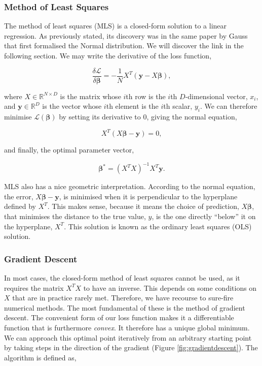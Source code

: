 \documentclass[11pt]{amsart}
\begin{document}
\subsubsection{Method of Least Squares}

The method of least squares (MLS) is a closed-form solution to a linear regression. As previously stated, its discovery was in the same paper by Gauss that first formalised the Normal distribution. We will discover the link in the following section. We may write the derivative of the loss function,

$$\frac{\delta\mathcal{L}}{\delta\boldsymbol\beta} = -\frac{1}{N}X^T(\mathbf{y} - X\boldsymbol\beta),$$

where $X \in \mathbb{R}^{N\times D}$ is the matrix whose $i$th row is the $i$th $D$-dimensional vector, $x_i$, and $\mathbf{y} \in \mathbb{R}^D$ is the vector whose $i$th element is the $i$th scalar, $y_i$. We can therefore minimise $\mathcal{L}(\boldsymbol\beta)$ by setting its derivative to 0, giving the normal equation,

$$X^T(X\boldsymbol\beta - \mathbf{y}) = 0,$$

and finally, the optimal parameter vector,

$$\boldsymbol\beta^* = (X^TX)^{-1}X^T\mathbf{y}.$$

MLS also has a nice geometric interpretation. According to the normal equation, the error, $X\boldsymbol\beta - \mathbf{y}$, is minimised when it is perpendicular to the hyperplane defined by $X^T$. This makes sense, because it means the choice of prediction, $X\boldsymbol\beta$, that minimises the distance to the true value, $y$, is the one directly ``below'' it on the hyperplane, $X^T$. This solution is known as the ordinary least squares (OLS) solution.

\subsubsection{Gradient Descent}

In most cases, the closed-form method of least squares cannot be used, as it requires the matrix $X^TX$ to have an inverse. This depends on some conditions on $X$ that are in practice rarely met. Therefore, we have recourse to sure-fire numerical methods. The most fundamental of these is the method of gradient descent. The convenient form of our loss function makes it a differentiable function that is furthermore \emph{convex}. It therefore has a unique global minimum. We can approach this optimal point iteratively from an arbitrary starting point by taking steps in the direction of the gradient (Figure \ref{fig:gradientdescent}). The algorithm is defined as,
\end{document}
